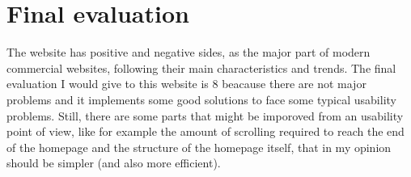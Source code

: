 \section{Final evaluation}
The website has positive and negative sides, as the major part of modern commercial websites, 
following their main characteristics and trends. 
The final evaluation I would give to this website is 8 beacause there are not major problems and 
it implements some good solutions to face some typical usability problems. Still, there are some 
parts that might be imporoved from an usability point of view, like for example the amount of scrolling
required to reach the end of the homepage and the structure of the homepage itself, that in my opinion
should be simpler (and also more efficient).
